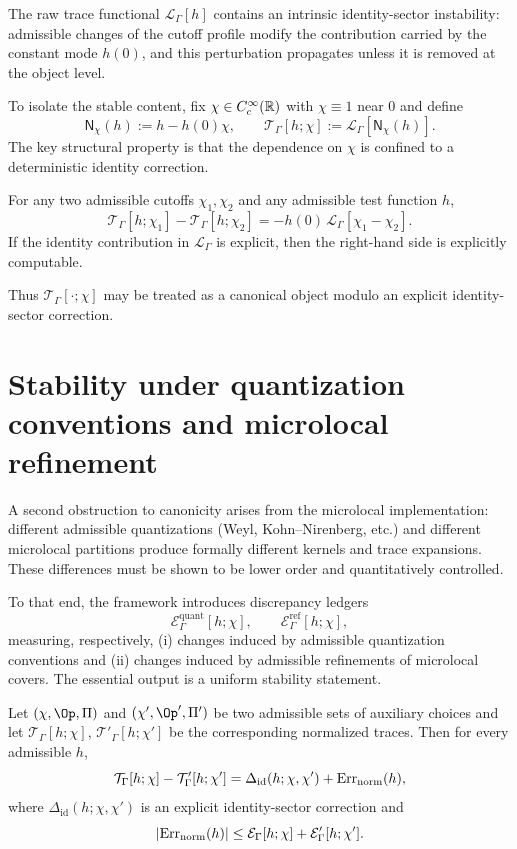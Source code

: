The raw trace functional $\mathcal L_\Gamma[h]$ contains an intrinsic identity-sector instability: admissible changes of the cutoff
profile modify the contribution carried by the constant mode $h(0)$, and this perturbation propagates unless it is removed at the
object level.

To isolate the stable content, fix $\chi\in C_c^\infty(\mathbb{R})$ with $\chi\equiv1$ near $0$ and define
\[
\mathsf N_\chi(h):=h-h(0)\chi,
\qquad
\mathcal T_\Gamma[h;\chi]:=\mathcal L_\Gamma[\mathsf N_\chi(h)].
\]
The key structural property is that the dependence on $\chi$ is confined to a deterministic identity correction.

\begin{theorem}\label{thm:11.cutoff-explicit}
For any two admissible cutoffs $\chi_1,\chi_2$ and any admissible test function $h$,
\[
\mathcal T_\Gamma[h;\chi_1]-\mathcal T_\Gamma[h;\chi_2]
=
-h(0)\,\mathcal L_\Gamma[\chi_1-\chi_2].
\]
If the identity contribution in $\mathcal L_\Gamma$ is explicit, then the right-hand side is explicitly computable.
\end{theorem}

\noindent
Thus $\mathcal T_\Gamma[\cdot;\chi]$ may be treated as a canonical object modulo an explicit identity-sector correction.

\section{Stability under quantization conventions and microlocal refinement}
\label{sec:11.quantization}

A second obstruction to canonicity arises from the microlocal implementation: different admissible quantizations
(Weyl, Kohn--Nirenberg, etc.) and different microlocal partitions produce formally different kernels and trace expansions.
These differences must be shown to be lower order and quantitatively controlled.

To that end, the framework introduces discrepancy ledgers
\[
\mathcal E^{\mathrm{quant}}_\Gamma[h;\chi],
\qquad
\mathcal E^{\mathrm{ref}}_\Gamma[h;\chi],
\]
measuring, respectively, (i) changes induced by admissible quantization conventions and (ii) changes induced by admissible
refinements of microlocal covers.  The essential output is a uniform stability statement.

\begin{theorem}\label{thm:11.norm-stability}
Let $(\chi,\Op,\Pi)$ and $(\chi',\Op',\Pi')$ be two admissible sets of auxiliary choices and let
$\mathcal T_\Gamma[h;\chi]$, $\mathcal T'_\Gamma[h;\chi']$ be the corresponding normalized traces.  Then for every admissible $h$,
\[
\mathcal T_\Gamma[h;\chi]-\mathcal T'_\Gamma[h;\chi']
=
\Delta_{\mathrm{id}}(h;\chi,\chi')
+
\mathrm{Err}_{\mathrm{norm}}(h),
\]
where $\Delta_{\mathrm{id}}(h;\chi,\chi')$ is an explicit identity-sector correction and
\[
|\mathrm{Err}_{\mathrm{norm}}(h)|
\le
\mathcal E_\Gamma[h;\chi]+\mathcal E'_\Gamma[h;\chi'].
\]
\end{theorem}

